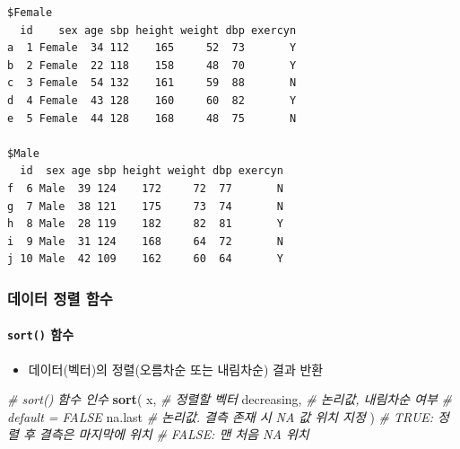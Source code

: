 \documentclass[
  11pt,
]{krantz}
\newenvironment{Shaded}{\begin{snugshade}}{\end{snugshade}}
\newcommand{\CommentTok}[1]{\textcolor[rgb]{0.37,0.37,0.37}{\textit{#1}}}
\newcommand{\KeywordTok}[1]{\textcolor[rgb]{0.27,0.27,0.27}{\textbf{#1}}}
\newcommand{\NormalTok}[1]{#1}
\newcommand{\OperatorTok}[1]{\textcolor[rgb]{0.43,0.43,0.43}{\textbf{#1}}}
\providecommand{\tightlist}{%
  \setlength{\itemsep}{0pt}\setlength{\parskip}{0pt}}
\begin{document}
\footnotesize

\begin{Shaded}
\end{Shaded}

\begin{verbatim}
$Female
  id    sex age sbp height weight dbp exercyn
a  1 Female  34 112    165     52  73       Y
b  2 Female  22 118    158     48  70       Y
c  3 Female  54 132    161     59  88       N
d  4 Female  43 128    160     60  82       Y
e  5 Female  44 128    168     48  75       N

$Male
  id  sex age sbp height weight dbp exercyn
f  6 Male  39 124    172     72  77       N
g  7 Male  38 121    175     73  74       N
h  8 Male  28 119    182     82  81       Y
i  9 Male  31 124    168     64  72       N
j 10 Male  42 109    162     60  64       Y
\end{verbatim}

\normalsize

\hypertarget{sort-fun}{%
\subsubsection*{데이터 정렬 함수}\label{sort-fun}}


\hypertarget{sort}{%
\paragraph{\texorpdfstring{\texttt{sort()} 함수}{sort() 함수}}\label{sort}}

\begin{itemize}
\tightlist
\item
  데이터(벡터)의 정렬(오름차순 또는 내림차순) 결과 반환
\end{itemize}

\footnotesize

\begin{Shaded}
\begin{Highlighting}[]
\CommentTok{# sort() 함수 인수}
\KeywordTok{sort}\NormalTok{(}
\NormalTok{  x, }\CommentTok{# 정렬할 벡터}
\NormalTok{  decreasing, }\CommentTok{# 논리값, 내림차순 여부}
              \CommentTok{# default = FALSE}
\NormalTok{  na.last }\CommentTok{# 논리값. 결측 존재 시 NA 값 위치 지정}
\NormalTok{)         }\CommentTok{# TRUE: 정렬 후 결측은 마지막에 위치}
          \CommentTok{# FALSE: 맨 처음 NA 위치}
\end{Highlighting}
\end{Shaded}
\end{document}
